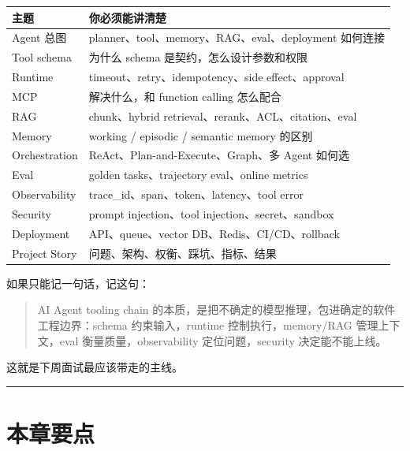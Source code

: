 \begingroup
\scriptsize
\setlength{\tabcolsep}{3pt}
\begin{longtable}{|p{}|p{}|}
\hline
主题 & 你必须能讲清楚 \\ \hline
Agent 总图 & planner、tool、memory、RAG、eval、deployment 如何连接 \\ \hline
Tool schema & 为什么 schema 是契约，怎么设计参数和权限 \\ \hline
Runtime & timeout、retry、idempotency、side effect、approval \\ \hline
MCP & 解决什么，和 function calling 怎么配合 \\ \hline
RAG & chunk、hybrid retrieval、rerank、ACL、citation、eval \\ \hline
Memory & working / episodic / semantic memory 的区别 \\ \hline
Orchestration & ReAct、Plan-and-Execute、Graph、多 Agent 如何选 \\ \hline
Eval & golden tasks、trajectory eval、online metrics \\ \hline
Observability & trace\_id、span、token、latency、tool error \\ \hline
Security & prompt injection、tool injection、secret、sandbox \\ \hline
Deployment & API、queue、vector DB、Redis、CI/CD、rollback \\ \hline
Project Story & 问题、架构、权衡、踩坑、指标、结果 \\ \hline
\end{longtable}
\endgroup

如果只能记一句话，记这句：


\begin{quote}
AI Agent tooling chain 的本质，是把不确定的模型推理，包进确定的软件工程边界：schema 约束输入，runtime 控制执行，memory/RAG 管理上下文，eval 衡量质量，observability 定位问题，security 决定能不能上线。\\
\end{quote}

这就是下周面试最应该带走的主线。


\bigskip\hrule\bigskip

\section{本章要点}


